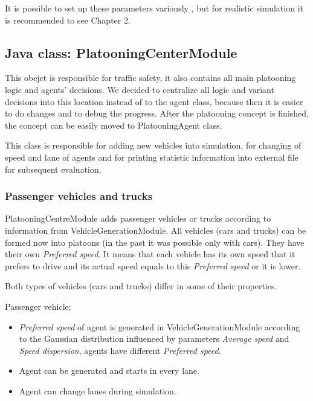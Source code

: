 It is possible to set up these parameters variously , but for realistic simulation it is recommended to see Chapter 2.




\subsection{Java class: PlatooningCenterModule}

This obejct is responsible for traffic safety, it also contains all main platooning logic and agents’ decisions. We decided to centralize all logic and variant decisions into this location instead of to the agent class, because then it is easier to do changes and to debug the progress. After the platooning concept is finished, the concept can be easily moved to PlatooningAgent class.

This class is responsible for adding new vehicles into simulation, for changing of speed and lane of agents and for printing statistic information into external file for subsequent evaluation. 

\subsubsection{Passenger vehicles and trucks}

PlatooningCentreModule adds passenger vehicles or trucks according to information from VehicleGenerationModule. All vehicles (cars and trucks) can be formed now into platoons (in the past it was possible only with cars). They have their own \textit{Preferred speed}. It means that each vehicle has its own speed that it prefers to drive and its actual speed equals to this \textit{Preferred speed} or it is lower. 

Both types of vehicles (cars and trucks) differ in some of their properties.

Passenger vehicle:

\begin{itemize}
\item \textit{Preferred speed} of agent is generated in VehicleGenerationModule according to the Gaussian distribution influenced by parameters \textit{Average speed} and \textit{Speed dispersion}, agents have different \textit{Preferred speed}.
\item Agent can be generated and starts in every lane.
\item Agent can change lanes during simulation.
\end{itemize}


